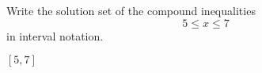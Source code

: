 

Write the solution set of the compound inequalities
\[5\leq x \leq 7 \]
in interval notation.

\begin{solution}
$[5, 7]$
\end{solution}